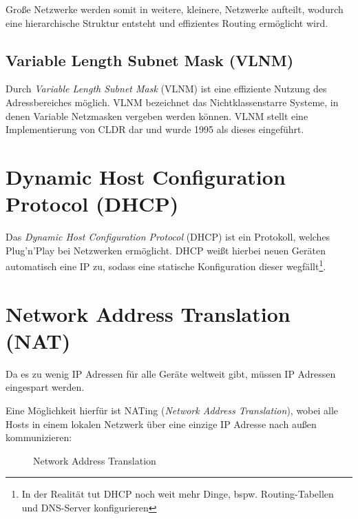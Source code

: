		Große Netzwerke werden somit in weitere, kleinere, Netzwerke aufteilt, wodurch eine hierarchische Struktur entsteht und effizientes Routing ermöglicht wird.

	\subsection{Variable Length Subnet Mask (VLNM)}
		Durch \textit{Variable Length Subnet Mask} (VLNM) ist eine effiziente Nutzung des Adressbereiches möglich. VLNM bezeichnet das Nichtklassenstarre Systeme, in denen Variable Netzmasken vergeben werden können. VLNM stellt eine Implementierung von CLDR dar und wurde 1995 als dieses eingeführt.

	\section{Dynamic Host Configuration Protocol (DHCP)} %
		Das \textit{Dynamic Host Configuration Protocol} (DHCP) ist ein Protokoll, welches Plug'n'Play bei Netzwerken ermöglicht. DHCP weißt hierbei neuen Geräten automatisch eine IP zu, sodass eine statische Konfiguration dieser wegfällt\footnote{In der Realität tut DHCP noch weit mehr Dinge, bspw. Routing-Tabellen und DNS-Server konfigurieren}.

	\section{Network Address Translation (NAT)}
		Da es zu wenig IP Adressen für alle Geräte weltweit gibt, müssen IP Adressen eingespart werden.

		Eine Möglichkeit hierfür ist NATing (\textit{Network Address Translation}), wobei alle Hosts in einem lokalen Netzwerk über eine einzige IP Adresse nach außen kommunizieren:
		\begin{figure}[H]
			\centering
			\caption{Network Address Translation}
		\end{figure}

